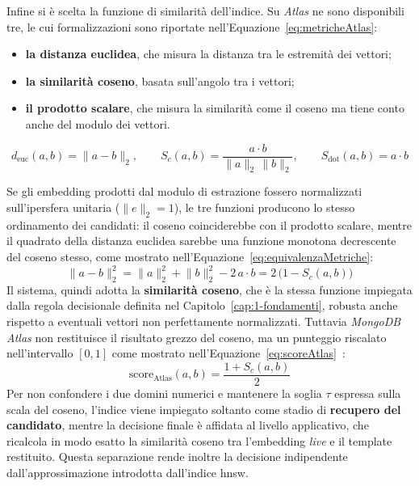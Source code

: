 Infine si è scelta la funzione di similarità dell'indice. 
Su \textit{Atlas} ne sono disponibili tre, le cui formalizzazioni sono riportate nell'Equazione~\eqref{eq:metricheAtlas}: 
\begin{itemize}
    \item \textbf{la distanza euclidea}, che misura la distanza tra le estremità dei vettori;
    \item \textbf{la similarità coseno}, basata sull'angolo tra i vettori;
    \item \textbf{il prodotto scalare}, che misura la similarità come il coseno ma tiene conto anche del modulo dei vettori.
\end{itemize}

\begin{equation}
    d_{\text{euc}}(a,b) = \lVert a - b \rVert_2, \qquad
    S_c(a,b) = \frac{a \cdot b}{\lVert a \rVert_2 \, \lVert b \rVert_2}, \qquad
    S_{\text{dot}}(a,b) = a \cdot b
    \label{eq:metricheAtlas}
\end{equation}

Se gli embedding prodotti dal modulo di estrazione fossero normalizzati sull'ipersfera unitaria ($\lVert e \rVert_2 = 1$), le tre funzioni producono lo stesso ordinamento dei candidati: il coseno coinciderebbe con il prodotto scalare, mentre il quadrato della distanza euclidea sarebbe una funzione monotona decrescente del coseno stesso, come mostrato nell'Equazione~\eqref{eq:equivalenzaMetriche}:
\begin{equation}
    \lVert a - b \rVert_2^2 = \lVert a \rVert_2^2 + \lVert b \rVert_2^2 - 2\, a \cdot b = 2\,\bigl(1 - S_c(a,b)\bigr)
    \label{eq:equivalenzaMetriche}
\end{equation}
Il sistema, quindi adotta la \textbf{similarità coseno}, che è la stessa funzione impiegata dalla regola decisionale definita nel Capitolo~\ref{cap:1-fondamenti}, robusta anche rispetto a eventuali vettori non perfettamente normalizzati. Tuttavia \textit{MongoDB Atlas} non restituisce il risultato grezzo del coseno, ma un punteggio riscalato nell'intervallo $[0,1]$ come mostrato nell'Equazione~\eqref{eq:scoreAtlas}~\cite{MongoDBVectorSearch}:
\begin{equation}
    \text{score}_{\text{Atlas}}(a,b) = \frac{1 + S_c(a,b)}{2}
    \label{eq:scoreAtlas}
\end{equation}
Per non confondere i due domini numerici e mantenere la soglia $\tau$ espressa sulla scala del coseno, l'indice viene impiegato soltanto come stadio di \textbf{recupero del candidato}, mentre la decisione finale è affidata al livello applicativo, che ricalcola in modo esatto la similarità coseno tra l'embedding \textit{live} e il template restituito. Questa separazione rende inoltre la decisione indipendente dall'approssimazione introdotta dall'indice \gls{hnsw}.

